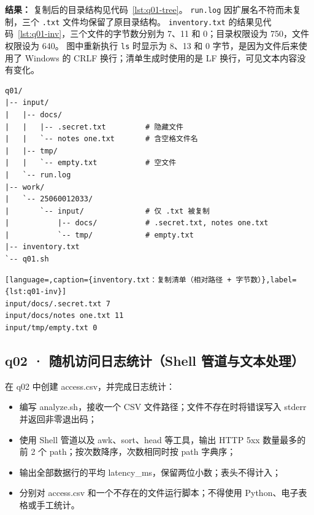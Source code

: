 \documentclass[12pt,a4paper,fontset=fandol]{ctexart}
\begin{document}
\textbf{结果：} 复制后的目录结构见代码~\ref{lst:q01-tree}。
\texttt{run.log} 因扩展名不符而未复制，三个 \texttt{.txt} 文件均保留了原目录结构。
\texttt{inventory.txt} 的结果见代码~\ref{lst:q01-inv}，三个文件的字节数分别为
7、11 和 0；目录权限设为 750，文件权限设为 640。
图中重新执行 \texttt{ls} 时显示为 8、13 和 0 字节，是因为文件后来使用了 Windows 的
CRLF 换行；清单生成时使用的是 LF 换行，可见文本内容没有变化。

\begin{lstlisting}[language=shell,caption={q01 最终目录结构（work/ 下仅复制 .txt 文件）},label={lst:q01-tree}]
q01/
|-- input/
|   |-- docs/
|   |   |-- .secret.txt         # 隐藏文件
|   |   `-- notes one.txt       # 含空格文件名
|   |-- tmp/
|   |   `-- empty.txt           # 空文件
|   `-- run.log
|-- work/
|   `-- 25060012033/
|       `-- input/              # 仅 .txt 被复制
|           |-- docs/           # .secret.txt, notes one.txt
|           `-- tmp/            # empty.txt
|-- inventory.txt
`-- q01.sh
\end{lstlisting}

\begin{lstlisting}[language=,caption={inventory.txt：复制清单（相对路径 + 字节数）},label={lst:q01-inv}]
input/docs/.secret.txt 7
input/docs/notes one.txt 11
input/tmp/empty.txt 0
\end{lstlisting}

\subsection{q02 · 随机访问日志统计（Shell 管道与文本处理）}

\begin{taskbox}[题目要求]
在 q02 中创建 access.csv，并完成日志统计：
\begin{itemize}[nosep]
  \item 编写 analyze.sh，接收一个 CSV 文件路径；文件不存在时将错误写入 stderr 并返回非零退出码；
  \item 使用 Shell 管道以及 awk、sort、head 等工具，输出 HTTP 5xx 数量最多的前 2 个 path；按次数降序，次数相同时按 path 字典序；
  \item 输出全部数据行的平均 latency\_ms，保留两位小数；表头不得计入；
  \item 分别对 access.csv 和一个不存在的文件运行脚本；不得使用 Python、电子表格或手工统计。
\end{itemize}
\end{taskbox}
\end{document}
